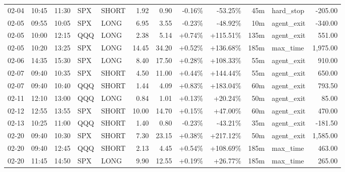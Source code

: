 \documentclass[11pt,a4paper,twoside]{article}
\begin{document}
\begin{center}
\begin{longtable}{>{\color{txtmain}}l l l l l r r r r r >{\color{txtmain}}l r}
02-04 & 10:45 & 11:30 & SPX & SHORT & 1.92 & 0.90 & \textcolor{lossred}{-0.16\%} & \textcolor{lossred}{-53.25\%} & 45m & hard\_stop & \textcolor{lossred}{-205.00} \\
02-05 & 09:55 & 10:05 & SPX & LONG & 6.95 & 3.55 & \textcolor{lossred}{-0.23\%} & \textcolor{lossred}{-48.92\%} & 10m & agent\_exit & \textcolor{lossred}{-340.00} \\
02-05 & 10:00 & 12:15 & QQQ & LONG & 2.38 & 5.14 & \textcolor{wingreen}{+0.74\%} & \textcolor{wingreen}{+115.51\%} & 135m & agent\_exit & \textcolor{wingreen}{551.00} \\
02-05 & 10:20 & 13:25 & SPX & LONG & 14.45 & 34.20 & \textcolor{wingreen}{+0.52\%} & \textcolor{wingreen}{+136.68\%} & 185m & max\_time & \textcolor{wingreen}{1,975.00} \\
02-06 & 14:35 & 15:30 & SPX & LONG & 8.40 & 17.50 & \textcolor{wingreen}{+0.28\%} & \textcolor{wingreen}{+108.33\%} & 55m & agent\_exit & \textcolor{wingreen}{910.00} \\
02-07 & 09:40 & 10:35 & SPX & SHORT & 4.50 & 11.00 & \textcolor{wingreen}{+0.44\%} & \textcolor{wingreen}{+144.44\%} & 55m & agent\_exit & \textcolor{wingreen}{650.00} \\
02-07 & 09:40 & 10:40 & QQQ & SHORT & 1.44 & 4.09 & \textcolor{wingreen}{+0.83\%} & \textcolor{wingreen}{+183.04\%} & 60m & agent\_exit & \textcolor{wingreen}{793.50} \\
02-11 & 12:10 & 13:00 & QQQ & LONG & 0.84 & 1.01 & \textcolor{wingreen}{+0.13\%} & \textcolor{wingreen}{+20.24\%} & 50m & agent\_exit & \textcolor{wingreen}{85.00} \\
02-12 & 12:55 & 13:55 & SPX & SHORT & 10.00 & 14.70 & \textcolor{wingreen}{+0.15\%} & \textcolor{wingreen}{+47.00\%} & 60m & agent\_exit & \textcolor{wingreen}{470.00} \\
02-13 & 10:25 & 11:00 & QQQ & SHORT & 1.40 & 0.80 & \textcolor{lossred}{-0.23\%} & \textcolor{lossred}{-43.21\%} & 35m & agent\_exit & \textcolor{lossred}{-181.50} \\
02-20 & 09:40 & 10:30 & SPX & SHORT & 7.30 & 23.15 & \textcolor{wingreen}{+0.38\%} & \textcolor{wingreen}{+217.12\%} & 50m & agent\_exit & \textcolor{wingreen}{1,585.00} \\
02-20 & 09:40 & 12:45 & QQQ & SHORT & 2.13 & 4.45 & \textcolor{wingreen}{+0.54\%} & \textcolor{wingreen}{+108.69\%} & 185m & max\_time & \textcolor{wingreen}{463.00} \\
02-20 & 11:45 & 14:50 & SPX & LONG & 9.90 & 12.55 & \textcolor{wingreen}{+0.19\%} & \textcolor{wingreen}{+26.77\%} & 185m & max\_time & \textcolor{wingreen}{265.00} \\

\end{longtable}
\end{center}
\end{document}

